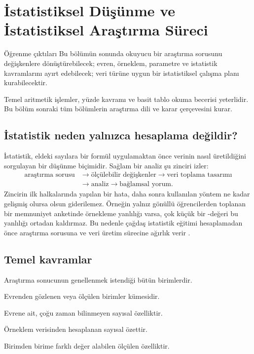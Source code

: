 \chapter{İstatistiksel Düşünme ve İstatistiksel Araştırma Süreci}
\label{ch:research}

\begin{prismbox}[PrismLight]{Öğrenme çıktıları}
Bu bölümün sonunda okuyucu bir araştırma sorusunu değişkenlere dönüştürebilecek;
evren, örneklem, parametre ve istatistik kavramlarını ayırt edebilecek; veri
türüne uygun bir istatistiksel çalışma planı kurabilecektir.
\end{prismbox}

\begin{prerequisitebox}
Temel aritmetik işlemler, yüzde kavramı ve basit tablo okuma becerisi
yeterlidir. Bu bölüm sonraki tüm bölümlerin araştırma dili ve karar
çerçevesini kurar.
\end{prerequisitebox}

\section{İstatistik neden yalnızca hesaplama değildir?}

İstatistik, eldeki sayılara bir formül uygulamaktan önce verinin nasıl
üretildiğini sorgulayan bir düşünme biçimidir. Sağlam bir analiz şu zinciri
izler:
\[
\begin{aligned}
\text{araştırma sorusu}&\longrightarrow\text{ölçülebilir değişkenler}
\longrightarrow\text{veri toplama tasarımı}\\
&\longrightarrow\text{analiz}\longrightarrow\text{bağlamsal yorum}.
\end{aligned}
\]
Zincirin ilk halkalarında yapılan bir hata, daha sonra kullanılan yöntem ne
kadar gelişmiş olursa olsun giderilemez. Örneğin yalnız gönüllü öğrencilerden
toplanan bir memnuniyet anketinde örnekleme yanlılığı varsa, çok küçük bir
\pval-değeri bu yanlılığı ortadan kaldırmaz. Bu nedenle çağdaş istatistik
eğitimi hesaplamadan önce araştırma sorusuna ve veri üretim sürecine ağırlık
verir \citep{gaise2016}.

\section{Temel kavramlar}

\begin{definitionbox}
\begin{description}[style=nextline,leftmargin=2.8cm,labelwidth=2.5cm]
  \item[Evren (anakütle)] Araştırma sonucunun genellenmek istendiği bütün birimlerdir.
  \item[Örneklem] Evrenden gözlenen veya ölçülen birimler kümesidir.
  \item[Parametre] Evrene ait, çoğu zaman bilinmeyen sayısal özelliktir.
  \item[İstatistik] Örneklem verisinden hesaplanan sayısal özettir.
  \item[Değişken] Birimden birime farklı değer alabilen ölçülen özelliktir.
\end{description}
\end{definitionbox}

